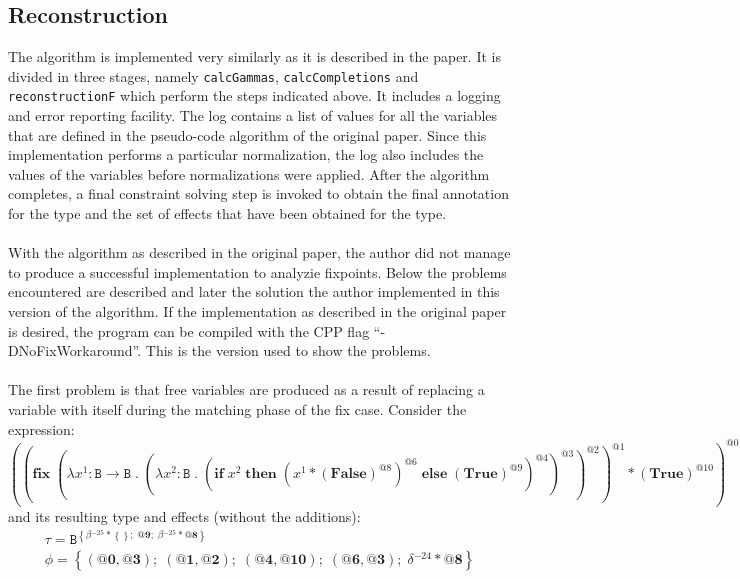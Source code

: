 \documentclass[8pt]{extarticle}
\begin{document}
\subsection{Reconstruction}
The algorithm is implemented very similarly as it is described in the paper. It is divided in three stages, namely \verb+calcGammas+, \verb+calcCompletions+ and \verb+reconstructionF+ which perform the steps indicated above. It includes a logging and error reporting facility. The log contains a list of values for all the variables that are defined in the pseudo-code algorithm of the original paper. Since this implementation performs a particular normalization, the log also includes the values of the variables before normalizations were applied. After the algorithm completes, a final constraint solving step is invoked to obtain the final annotation for the type and the set of effects that have been obtained for the type.
\\\\
With the algorithm as described in the original paper, the author did not manage to produce a successful implementation to analyzie fixpoints. Below the problems encountered are described and later the solution the author implemented in this version of the algorithm. If the implementation as described in the original paper is desired, the program can be compiled with the CPP flag ``-DNoFixWorkaround''. This is the version used to show the problems.
\\\\
The first problem is that free variables are produced as a result of replacing a variable with itself during the matching phase of the fix case. Consider the expression:
\[
\left(\left(\mathbf{fix}\;{}\left(\lambda{}x^{1}:\mathtt{B}\to{}\mathtt{B}\;{}.\;{}\left(\lambda{}x^{2}:\mathtt{B}\;{}.\;{}\left(\mathbf{if}\;{}x^{2}\;{}\mathbf{then}\;{}\left(x^{1}*\left(\mathbf{False}\right)^{\mathit{@8}}\right)^{\mathit{@6}}\;{}\mathbf{else}\;{}\left(\mathbf{True}\right)^{\mathit{@9}}\right)^{\mathit{@4}}\right)^{\mathit{@3}}\right)^{\mathit{@2}}\right)^{\mathit{@1}}*\left(\mathbf{True}\right)^{\mathit{@10}}\right)^{\mathit{@0}}
\]
and its resulting type and effects (without the additions):
\[
\begin{array}{c}
\tau=\mathtt{B}^{\left\{\beta{}^{-25}*\left\{\right\};\;{}\textbf{@9};\;{}\beta{}^{-25}*\textbf{@8}\right\}} \\
\phi=\left\{\left(\textbf{@0},\textbf{@3}\right);\;{}\left(\textbf{@1},\textbf{@2}\right);\;{}\left(\textbf{@4},\textbf{@10}\right);\;{}\left(\textbf{@6},\textbf{@3}\right);\;{}\delta{}^{-24}*\textbf{@8}\right\}
\end{array}
\]
\end{document}

